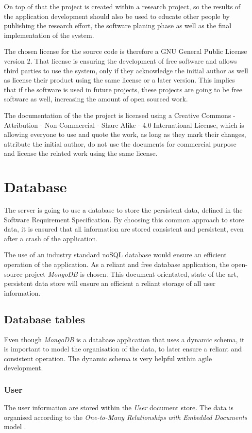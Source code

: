 On top of that the project is created within a research project, so the results of the application development should also be used to educate other people by publishing the research effort, the software planing phase as well as the final implementation of the system.

The chosen license for the source code is therefore a GNU General Public License version 2. That license is ensuring the development of free software and allows third parties to use the system, only if they acknowledge the initial author as well as license their product using the same license or a later version. This implies that if the software is used in future projects, these projects are going to be free software as well, increasing the amount of open sourced work.

The documentation of the the project is licensed using a Creative Commons - Attribution - Non Commercial - Share Alike - 4.0 International License, which is allowing everyone to use and quote the work, as long as they mark their changes, attribute the initial author, do not use the documents for commercial purpose and license the related work using the same license.

\chapter{Database}
The server is going to use a database to store the persistent data, defined in the Software Requirement Specification. By choosing this common approach to store data, it is ensured that all information are stored consistent and persistent, even after a crash of the application.

The use of an industry standard noSQL database would ensure an efficient operation of the application. As a reliant and free database application, the open-source project \emph{MongoDB} is chosen. This document orientated, state of the art, persistent data store will ensure an efficient a reliant storage of all user information.

\section{Database tables}
Even though \emph{MongoDB} is a database application that uses a dynamic schema, it is important to model the organisation of the data, to later ensure a reliant and consistent operation. The dynamic schema is very helpful within agile development.

\subsection{User}
The user information are stored within the \emph{User} document store. The data is organised according to the \emph{One-to-Many Relationships with Embedded Documents} model \cite[p. 141]{Mongo:2014aa}.

